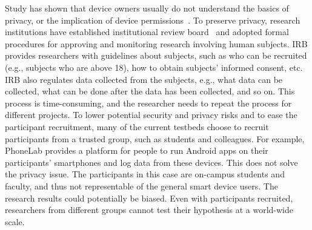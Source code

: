 Study has shown that device owners usually do not understand the 
basics of privacy, or the implication of device 
permissions~\cite{camp2015respecting}. 
To preserve privacy, research institutions have established 
institutional review board~\cite{irb} and adopted formal 
procedures for approving and monitoring research involving 
human subjects. IRB provides researchers with guidelines about 
subjects, such as who can be recruited (e.g., subjects
who are above 18), 
how to obtain subjects' informed consent, etc. IRB also 
regulates data collected from the subjects, e.g., what data can be collected, what can 
be done after the data has been collected, and so on. This
process is time-consuming, and the researcher needs to repeat
the process for different projects. To lower potential security and 
privacy risks and to ease the participant recruitment, many of the current testbeds choose to 
recruit participants from a trusted group, such as students and 
colleagues. For example, PhoneLab provides a platform for 
people to run Android apps on their participants' smartphones 
and log data from these devices. %
This does not solve the privacy issue. 
The participants in this case are on-campus students and faculty, 
and thus not representable of the general smart device users. 
The research results could potentially be biased.
Even with participants recruited, researchers from different 
groups cannot test their hypothesis at a world-wide scale. 
  
